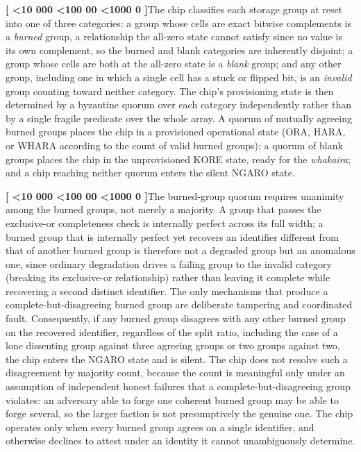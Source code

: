 \documentclass[12pt,letterpaper]{article}
\newcounter{para}
\newcommand{\padzero}{%
  \ifnum\value{para}<10 000\else%
  \ifnum\value{para}<100 00\else%
  \ifnum\value{para}<1000 0\else%
  \fi\fi\fi}
\newcommand{\para}{%
  \refstepcounter{para}\noindent\textbf{[\padzero\arabic{para}]}\hspace{0.5em}\ignorespaces}
\begin{document}
\para The chip classifies each storage group at reset into one of three categories: a group whose cells are exact bitwise complements is a \emph{burned} group, a relationship the all-zero state cannot satisfy since no value is its own complement, so the burned and blank categories are inherently disjoint; a group whose cells are both at the all-zero state is a \emph{blank} group; and any other group, including one in which a single cell has a stuck or flipped bit, is an \emph{invalid} group counting toward neither category. The chip's provisioning state is then determined by a byzantine quorum over each category independently rather than by a single fragile predicate over the whole array. A quorum of mutually agreeing burned groups places the chip in a provisioned operational state (ORA, HARA, or WHARA according to the count of valid burned groups); a quorum of blank groups places the chip in the unprovisioned KORE state, ready for the \emph{whakaira}; and a chip reaching neither quorum enters the silent NGARO state.

\para The burned-group quorum requires unanimity among the burned groups, not merely a majority. A group that passes the exclusive-or completeness check is internally perfect across its full width; a burned group that is internally perfect yet recovers an identifier different from that of another burned group is therefore not a degraded group but an anomalous one, since ordinary degradation drives a failing group to the invalid category (breaking its exclusive-or relationship) rather than leaving it complete while recovering a second distinct identifier. The only mechanisms that produce a complete-but-disagreeing burned group are deliberate tampering and coordinated fault. Consequently, if any burned group disagrees with any other burned group on the recovered identifier, regardless of the split ratio, including the case of a lone dissenting group against three agreeing groups or two groups against two, the chip enters the NGARO state and is silent. The chip does not resolve such a disagreement by majority count, because the count is meaningful only under an assumption of independent honest failures that a complete-but-disagreeing group violates: an adversary able to forge one coherent burned group may be able to forge several, so the larger faction is not presumptively the genuine one. The chip operates only when every burned group agrees on a single identifier, and otherwise declines to attest under an identity it cannot unambiguously determine.
\end{document}
